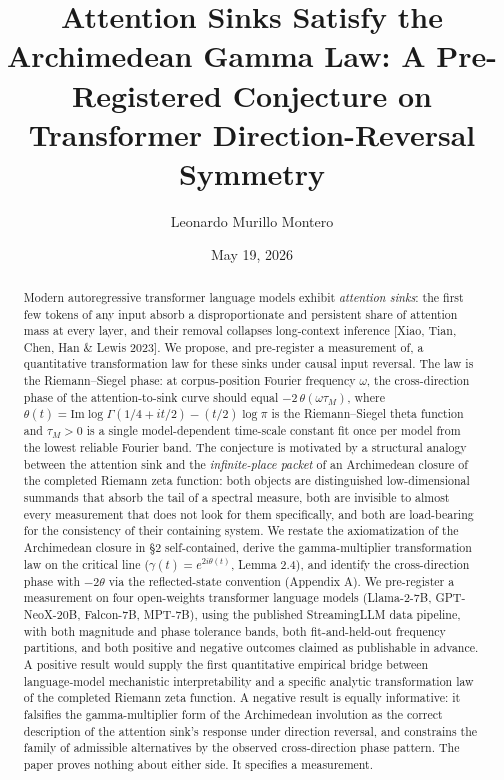 \documentclass[
  letterpaper,
  11pt]{article}
\title{Attention Sinks Satisfy the Archimedean Gamma Law: A Pre-Registered Conjecture on Transformer Direction-Reversal Symmetry}
\author{Leonardo Murillo Montero}
\date{May 19, 2026}
\theoremstyle{plain}
\theoremstyle{definition}
\theoremstyle{remark}
\begin{document}
\maketitle
\begin{abstract}
Modern autoregressive transformer language models exhibit \emph{attention sinks}: the first few tokens of any input absorb a disproportionate and persistent share of attention mass at every layer, and their removal collapses long-context inference {[}Xiao, Tian, Chen, Han \& Lewis 2023{]}. We propose, and pre-register a measurement of, a quantitative transformation law for these sinks under causal input reversal. The law is the Riemann--Siegel phase: at corpus-position Fourier frequency \(\omega\), the cross-direction phase of the attention-to-sink curve should equal \(-2\,\theta(\omega \tau_M)\), where \(\theta(t) = \mathrm{Im}\log\Gamma(1/4 + it/2) - (t/2)\log\pi\) is the Riemann--Siegel theta function and \(\tau_M > 0\) is a single model-dependent time-scale constant fit once per model from the lowest reliable Fourier band. The conjecture is motivated by a structural analogy between the attention sink and the \emph{infinite-place packet} of an Archimedean closure of the completed Riemann zeta function: both objects are distinguished low-dimensional summands that absorb the tail of a spectral measure, both are invisible to almost every measurement that does not look for them specifically, and both are load-bearing for the consistency of their containing system. We restate the axiomatization of the Archimedean closure in §2 self-contained, derive the gamma-multiplier transformation law on the critical line (\(\gamma(t) = e^{2i\theta(t)}\), Lemma 2.4), and identify the cross-direction phase with \(-2\theta\) via the reflected-state convention (Appendix A). We pre-register a measurement on four open-weights transformer language models (Llama-2-7B, GPT-NeoX-20B, Falcon-7B, MPT-7B), using the published StreamingLLM data pipeline, with both magnitude and phase tolerance bands, both fit-and-held-out frequency partitions, and both positive and negative outcomes claimed as publishable in advance. A positive result would supply the first quantitative empirical bridge between language-model mechanistic interpretability and a specific analytic transformation law of the completed Riemann zeta function. A negative result is equally informative: it falsifies the gamma-multiplier form of the Archimedean involution as the correct description of the attention sink's response under direction reversal, and constrains the family of admissible alternatives by the observed cross-direction phase pattern. The paper proves nothing about either side. It specifies a measurement.
\end{abstract}
\end{document}
